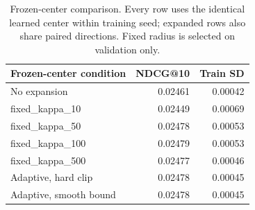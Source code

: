 \begin{table}[t]
\centering\small
\begin{tabular}{lrr}
\toprule
Frozen-center condition & NDCG@10 & Train SD\\
\midrule
No expansion & 0.02461 & 0.00042\\
fixed\_kappa\_10 & 0.02449 & 0.00069\\
fixed\_kappa\_50 & 0.02478 & 0.00053\\
fixed\_kappa\_100 & 0.02479 & 0.00053\\
fixed\_kappa\_500 & 0.02477 & 0.00046\\
Adaptive, hard clip & 0.02478 & 0.00045\\
Adaptive, smooth bound & 0.02478 & 0.00045\\
\bottomrule
\end{tabular}
\caption{Frozen-center comparison. Every row uses the identical learned center within training seed; expanded rows also share paired directions. Fixed radius is selected on validation only.}
\label{tab:frozen-center-radius}
\end{table}
